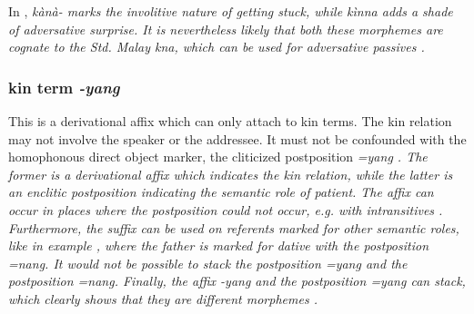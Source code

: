 In , \em kànà- \em marks the involitive nature of getting stuck, while \em kìnna \em adds a shade of adversative surprise. It is nevertheless likely that both these morphemes are cognate to the Std. Malay \em k\E na, \em which can be used for adversative passives \citep{Chung2005kena}.





% 
% 
% 
% 



\subsubsection{kin term \em -yang\em}\label{sec:morph:-yang}
This is a derivational affix which can only attach to kin terms. The kin relation may not involve the speaker or the addressee. It must not be confounded with the homophonous direct object marker, the cliticized postposition \em =yang \em {}. The former is a derivational affix which indicates the kin relation, while the latter is an enclitic postposition indicating the semantic role of patient. The affix can occur in places where the postposition could not occur, e.g. with intransitives . Furthermore, the suffix can be used on referents marked for other semantic roles, like in  example , where the father is marked for dative with the postposition \em =nang\em. It would not be possible to stack the postposition \em =yang \em and the postposition \em =nang\em. Finally, the affix \em -yang \em and the postposition \em =yang \em can stack, which clearly shows that they are different morphemes .

